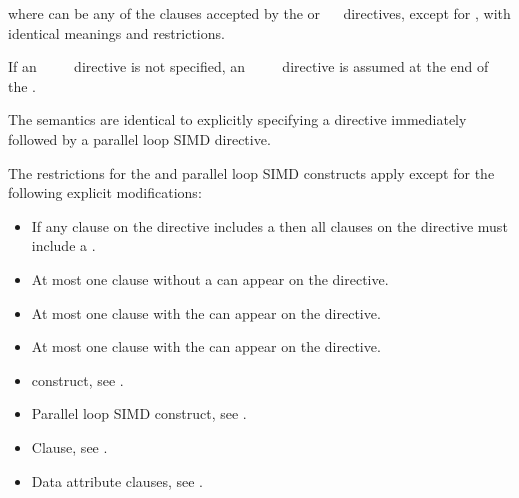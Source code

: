 {{{{where  can be any of the clauses accepted by the  or 
~~ directives, except for , with identical meanings and restrictions.

If an ~~~~ directive is not specified, an 
~~~~ directive is assumed at the end of 
the .
\fortranspecificend

\descr
The semantics are identical to explicitly specifying a  directive
immediately followed by a parallel loop SIMD directive.


\restrictions
The restrictions for the  and parallel loop SIMD constructs apply except for the following explicit modifications:

\begin{itemize}
\item If any  clause on the directive includes a
       then all  clauses 
      on the directive must include a .

\item At most one  clause without a 
       can appear on the directive.

\item At most one  clause with the  
       can appear on the directive.


\item At most one  clause with the  
       can appear on the directive.
\end{itemize}

\crossreferences
\begin{itemize}
\item {} construct, see
.

\item Parallel loop SIMD construct, see
.

\item {} Clause, see .

\item Data attribute clauses, see
.

\end{itemize}










}}}}
